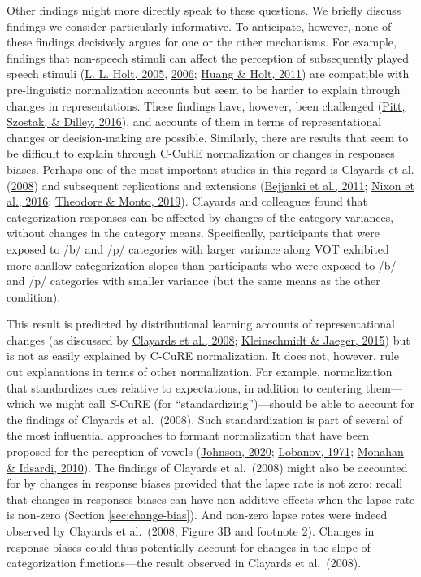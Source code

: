 \documentclass[
  11pt,
  man,floatsintext]{apa6}
\begin{document}
Other findings might more directly speak to these questions. We briefly discuss findings we consider particularly informative. To anticipate, however, none of these findings decisively argues for one or the other mechanisms. For example, findings that non-speech stimuli can affect the perception of subsequently played speech stimuli (\protect\hyperlink{ref-holt2005}{L. L. Holt, 2005}, \protect\hyperlink{ref-holt2006}{2006}; \protect\hyperlink{ref-huang-holt2011}{Huang \& Holt, 2011}) are compatible with pre-linguistic normalization accounts but seem to be harder to explain through changes in representations. These findings have, however, been challenged (\protect\hyperlink{ref-pitt2016}{Pitt, Szostak, \& Dilley, 2016}), and accounts of them in terms of representational changes or decision-making are possible. Similarly, there are results that seem to be difficult to explain through C-CuRE normalization or changes in responses biases. Perhaps one of the most important studies in this regard is Clayards et al. (\protect\hyperlink{ref-clayards2008}{2008}) and subsequent replications and extensions (\protect\hyperlink{ref-bejjanki2011}{Bejjanki et al., 2011}; \protect\hyperlink{ref-nixon2016}{Nixon et al., 2016}; \protect\hyperlink{ref-theodore-monto2019}{Theodore \& Monto, 2019}). Clayards and colleagues found that categorization responses can be affected by changes of the category variances, without changes in the category means. Specifically, participants that were exposed to /b/ and /p/ categories with larger variance along VOT exhibited more shallow categorization slopes than participants who were exposed to /b/ and /p/ categories with smaller variance (but the same means as the other condition).

This result is predicted by distributional learning accounts of representational changes (as discussed by \protect\hyperlink{ref-clayards2008}{Clayards et al., 2008}; \protect\hyperlink{ref-kleinschmidt-jaeger2015}{Kleinschmidt \& Jaeger, 2015}) but is not as easily explained by C-CuRE normalization. It does not, however, rule out explanations in terms of other normalization. For example, normalization that standardizes cues relative to expectations, in addition to centering them---which we might call \emph{S}-CuRE (for ``standardizing'')---should be able to account for the findings of Clayards et al.~(2008). Such standardization is part of several of the most influential approaches to formant normalization that have been proposed for the perception of vowels (\protect\hyperlink{ref-johnson2020}{Johnson, 2020}; \protect\hyperlink{ref-lobanov1971}{Lobanov, 1971}; \protect\hyperlink{ref-monahan-idsardi2010}{Monahan \& Idsardi, 2010}). The findings of Clayards et al.~(2008) might also be accounted for by changes in response biases provided that the lapse rate is not zero: recall that changes in responses biases can have non-additive effects when the lapse rate is non-zero (Section \ref{sec:change-bias}). And non-zero lapse rates were indeed observed by Clayards et al.~(2008, Figure 3B and footnote 2). Changes in response biases could thus potentially account for changes in the slope of categorization functions---the result observed in Clayards et al.~(2008).
\end{document}
